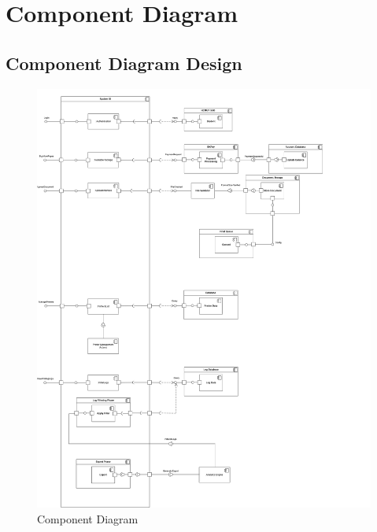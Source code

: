 \newpage
\section{Component Diagram}
\subsection{Component Diagram Design}
\begin{figure}[H]
    \centering
    \includegraphics[width=1\linewidth]{images/component_diagram.png}
    \caption{Component Diagram}
    \label{fig:enter-label}
\end{figure}

\newpage
